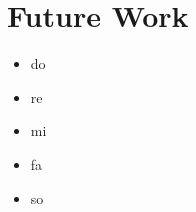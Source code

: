 \documentclass[
    USenglish,
    accentcolor=9c,
    fontsize= 12pt,
    a4paper,
    aspectratio=169,
    colorback=true,
    fancy_row_colors,
    leqno,
    fleqn,
    boxarc=3pt,
    fleqn,
    main,
    design=2008, %
]{algoslides}
\begin{document}
    \section{Future Work}
    \begin{frame}
        \slidehead{}
        \begin{itemize}
            \item do
            \item re
            \item mi
            \item fa
            \item so
        \end{itemize}
    \end{frame}



    \begin{frame}
    \end{frame}
\end{document}
